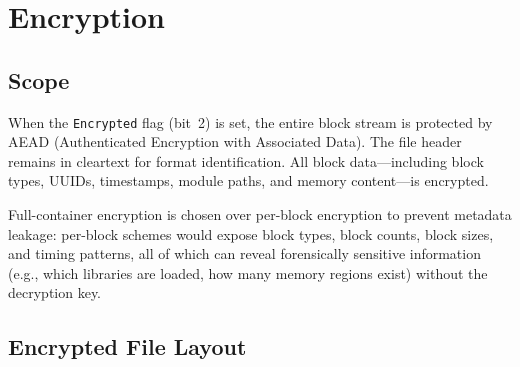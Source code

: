\documentclass[11pt,a4paper]{article}
\newcommand{\field}[1]{\texttt{#1}}
\begin{document}
\newpage
\section{Encryption}\label{sec:encryption}

\subsection{Scope}
When the \field{Encrypted} flag (bit~2) is set, the entire block stream is protected by AEAD (Authenticated Encryption with Associated Data). The file header remains in cleartext for format identification. All block data---including block types, UUIDs, timestamps, module paths, and memory content---is encrypted.

Full-container encryption is chosen over per-block encryption to prevent metadata leakage: per-block schemes would expose block types, block counts, block sizes, and timing patterns, all of which can reveal forensically sensitive information (e.g., which libraries are loaded, how many memory regions exist) without the decryption key.

\subsection{Encrypted File Layout}\label{sec:enclayout}
\end{document}
